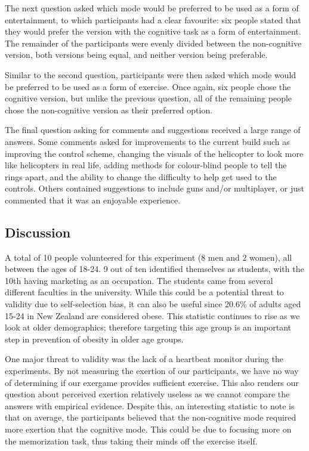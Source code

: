 \documentclass[11pt, 
]{IEEEtran}
\begin{document}
The next question asked which mode would be preferred to be used as a form of entertainment, to which participants had a clear favourite: six people stated that they would prefer the version with the cognitive task as a form of entertainment. The remainder of the participants were evenly divided between the non-cognitive version, both versions being equal, and neither version being preferable.

Similar to the second question, participants were then asked which mode would be preferred to be used as a form of exercise. Once again, six people chose the cognitive version, but unlike the previous question, all of the remaining people chose the non-cognitive version as their preferred option.

The final question asking for comments and suggestions received a large range of answers. Some comments asked for improvements to the current build such as improving the control scheme, changing the visuals of the helicopter to look more like helicopters in real life, adding methods for colour-blind people to tell the rings apart, and the ability to change the difficulty to help get used to the controls. Others contained suggestions to include guns and/or multiplayer, or just commented that it was an enjoyable experience.

\subsection{Discussion}

A total of 10 people volunteered for this experiment (8 men and 2 women), all between the ages of 18-24. 9 out of ten identified themselves as students, with the 10th having marketing as an occupation. The students came from several different faculties in the university. While this could be a potential threat to validity due to self-selection bias, it can also be useful since 20.6\% of adults aged 15-24 in New Zealand are considered obese. This statistic continues to rise as we look at older demographics; therefore targeting this age group is an important step in prevention of obesity in older age groups.

One major threat to validity was the lack of a heartbeat monitor during the experiments. By not measuring the exertion of our participants, we have no way of determining if our exergame provides sufficient exercise. This also renders our question about perceived exertion relatively useless as we cannot compare the answers with empirical evidence. Despite this, an interesting statistic to note is that on average, the participants believed that the non-cognitive mode required more exertion that the cognitive mode. This could be due to focusing more on the memorization task, thus taking their minds off the exercise itself.
\end{document}
